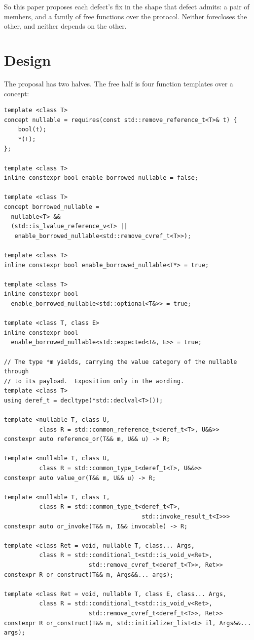 \documentclass[a4paper,10pt,oneside,openany,final,article]{memoir}
\begin{document}
So this paper proposes each defect's fix in the shape that defect admits: a
pair of members, and a family of free functions over the protocol. Neither
forecloses the other, and neither depends on the other.

\chapter{Design}

The proposal has two halves. The free half is four function templates over a
 concept:

\begin{verbatim}
template <class T>
concept nullable = requires(const std::remove_reference_t<T>& t) {
    bool(t);
    *(t);
};

template <class T>
inline constexpr bool enable_borrowed_nullable = false;

template <class T>
concept borrowed_nullable =
  nullable<T> &&
  (std::is_lvalue_reference_v<T> ||
   enable_borrowed_nullable<std::remove_cvref_t<T>>);

template <class T>
inline constexpr bool enable_borrowed_nullable<T*> = true;

template <class T>
inline constexpr bool
  enable_borrowed_nullable<std::optional<T&>> = true;

template <class T, class E>
inline constexpr bool
  enable_borrowed_nullable<std::expected<T&, E>> = true;

// The type *m yields, carrying the value category of the nullable through
// to its payload.  Exposition only in the wording.
template <class T>
using deref_t = decltype(*std::declval<T>());

template <nullable T, class U,
          class R = std::common_reference_t<deref_t<T>, U&&>>
constexpr auto reference_or(T&& m, U&& u) -> R;

template <nullable T, class U,
          class R = std::common_type_t<deref_t<T>, U&&>>
constexpr auto value_or(T&& m, U&& u) -> R;

template <nullable T, class I,
          class R = std::common_type_t<deref_t<T>,
                                       std::invoke_result_t<I>>>
constexpr auto or_invoke(T&& m, I&& invocable) -> R;

template <class Ret = void, nullable T, class... Args,
          class R = std::conditional_t<std::is_void_v<Ret>,
                        std::remove_cvref_t<deref_t<T>>, Ret>>
constexpr R or_construct(T&& m, Args&&... args);

template <class Ret = void, nullable T, class E, class... Args,
          class R = std::conditional_t<std::is_void_v<Ret>,
                        std::remove_cvref_t<deref_t<T>>, Ret>>
constexpr R or_construct(T&& m, std::initializer_list<E> il, Args&&... args);
\end{verbatim}
\end{document}
